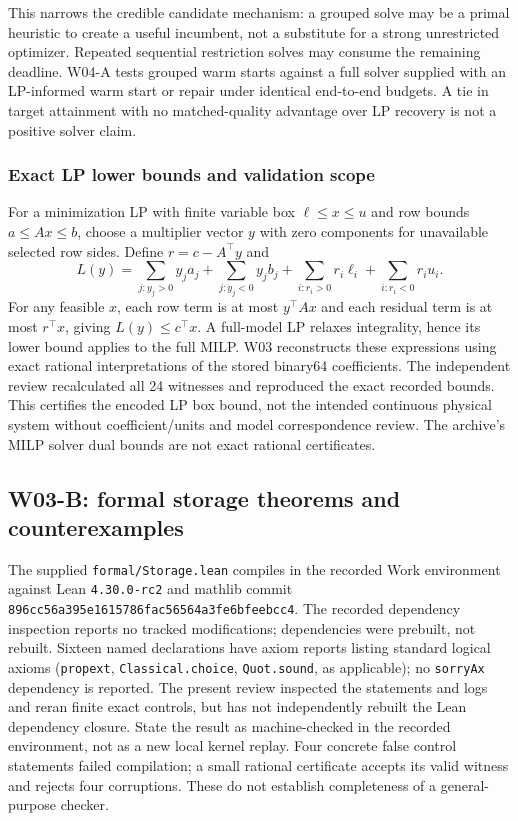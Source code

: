\documentclass[11pt,letterpaper]{article}
\begin{document}
This narrows the credible candidate mechanism: a grouped solve may be a primal heuristic to create a useful incumbent, not a substitute for a strong unrestricted optimizer. Repeated sequential restriction solves may consume the remaining deadline. W04-A tests grouped warm starts against a full solver supplied with an LP-informed warm start or repair under identical end-to-end budgets. A tie in target attainment with no matched-quality advantage over LP recovery is not a positive solver claim.

\subsubsection{Exact LP lower bounds and validation scope}
For a minimization LP with finite variable box $\ell\le x\le u$ and row bounds $a\le Ax\le b$, choose a multiplier vector $y$ with zero components for unavailable selected row sides. Define $r=c-A^\top y$ and
\[
 L(y)=\sum_{j:y_j>0}y_j a_j+\sum_{j:y_j<0}y_j b_j
 +\sum_{i:r_i>0}r_i\ell_i+\sum_{i:r_i<0}r_i u_i.
\]
For any feasible $x$, each row term is at most $y^\top Ax$ and each residual term is at most $r^\top x$, giving $L(y)\le c^\top x$. A full-model LP relaxes integrality, hence its lower bound applies to the full MILP. W03 reconstructs these expressions using exact rational interpretations of the stored binary64 coefficients. The independent review recalculated all 24 witnesses and reproduced the exact recorded bounds. This certifies the encoded LP box bound, not the intended continuous physical system without coefficient/units and model correspondence review. The archive's MILP solver dual bounds are not exact rational certificates.

\subsection{W03-B: formal storage theorems and counterexamples}
The supplied \texttt{formal/Storage.lean} compiles in the recorded Work environment against Lean \texttt{4.30.0-rc2} and mathlib commit \texttt{896cc56a395e1615786fac56564a3fe6bfeebcc4}. The recorded dependency inspection reports no tracked modifications; dependencies were prebuilt, not rebuilt. Sixteen named declarations have axiom reports listing standard logical axioms (\texttt{propext}, \texttt{Classical.choice}, \texttt{Quot.sound}, as applicable); no \texttt{sorryAx} dependency is reported. The present review inspected the statements and logs and reran finite exact controls, but has not independently rebuilt the Lean dependency closure. State the result as machine-checked in the recorded environment, not as a new local kernel replay. Four concrete false control statements failed compilation; a small rational certificate accepts its valid witness and rejects four corruptions. These do not establish completeness of a general-purpose checker.
\end{document}
